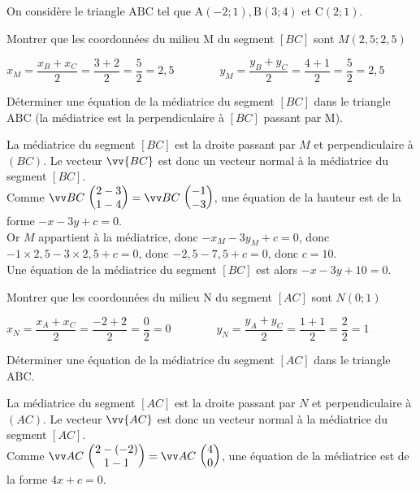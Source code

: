 \documentclass[12pt,a4paper]{article}  %
\begin{document}
On considère le triangle $\mathrm{ABC}$ tel que $\mathrm{A}(-2 ;1), \mathrm{B}(3 ; 4)$ et $\mathrm{C}(2 ; 1)$.
\begin{enumMet}
	\item Montrer que les coordonnées du milieu M du segment $[BC]$ sont $M(2,5;2,5)$\\
	\begin{corrBox}
		$x_M=\dfrac{x_B+x_C}{2}=\dfrac{3+2}{2}=\dfrac{5}{2}=2,5\quad \quad \quad \quad y_M=\dfrac{y_B+y_C}{2}=\dfrac{4+1}{2}=\dfrac{5}{2}=2,5$
	\end{corrBox}
	\item Déterminer une équation de la médiatrice  du segment $[BC]$ dans le triangle $\mathrm{ABC}$ (la médiatrice est la perpendiculaire à $[BC]$ passant par M).\\
	\begin{corrBox}
		La médiatrice du segment $[BC]$ est la droite passant par $M$ et perpendiculaire à $(BC)$. Le vecteur $\vv{BC}$ est donc un vecteur normal à la médiatrice du segment $[BC]$.\\
		Comme $\Coord{BC}{2-3}{1-4}=\Coord{BC}{-1}{-3}$, une équation de la hauteur est de la forme $-x-3y+c=0$.\\
		Or $M$ appartient à la médiatrice, donc $-x_{M}-3y_{M}+c=0$, donc $-1\times 2,5-3\times2,5+c=0$, donc $-2,5-7,5+c=0$, donc $c=10$.\\
		Une équation de la médiatrice du segment $[BC]$ est alors $-x-3y+10=0$.
	\end{corrBox}
	\item {} Montrer que les coordonnées du milieu N du segment $[AC]$ sont $N(0;1)$\\
	\begin{corrBox}
		$x_N=\dfrac{x_A+x_C}{2}=\dfrac{-2+2}{2}=\dfrac{0}{2}=0\quad \quad \quad \quad y_N=\dfrac{y_A+y_C}{2}=\dfrac{1+1}{2}=\dfrac{2}{2}=1$
	\end{corrBox}
	\item Déterminer une équation de la médiatrice  du segment $[AC]$ dans le triangle $\mathrm{ABC}$.\\
	\begin{corrBox}
		La médiatrice du segment $[AC]$ est la droite passant par $N$ et perpendiculaire à $(A C)$. Le vecteur $\vv{A C}$ est donc un vecteur normal à la médiatrice du segment $[AC]$.\\
		Comme $\Coord{AC}{2-(-2)}{1-1}=\Coord{AC}{4}{0}$, une équation de la médiatrice est de la forme $4x+c=0$.\\

\end{corrBox}
\end{enumMet}
\end{document}
